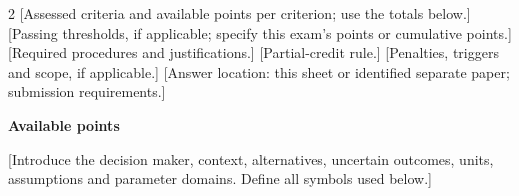 \begin{multicols}{2}
\raggedcolumns
\setlength{\parskip}{3pt}
[Assessed criteria and available points per criterion; use the totals below.]
[Passing thresholds, if applicable; specify this exam's points or cumulative
points.] [Required procedures and justifications.] [Partial-credit rule.]
[Penalties, triggers and scope, if applicable.] [Answer location: this sheet
or identified separate paper; submission requirements.]

\noindent\begin{minipage}{\linewidth}
\centering\small
\setlength{\tabcolsep}{4pt}\renewcommand{\arraystretch}{1.05}
\textbf{Available points}\par\smallskip
%
%
\ifdim\dimexpr\wd\ScoreTableA+\ScoreTableGap+\wd\ScoreTableB\relax>\linewidth
\usebox{\ScoreTableA}\par\smallskip\usebox{\ScoreTableB}%
\else
\usebox{\ScoreTableA}\hspace{\ScoreTableGap}\usebox{\ScoreTableB}%
\fi
\end{minipage}\par

[Introduce the decision maker, context, alternatives, uncertain outcomes,
units, assumptions and parameter domains. Define all symbols used below.]


\end{multicols}
